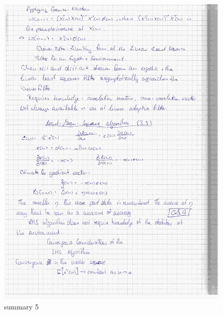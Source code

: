 \documentclass[paper=a4, fontsize=11pt]{scrartcl} %
\numberwithin{equation}{section} %
\numberwithin{figure}{section} %
\numberwithin{table}{section} %
\begin{document}
\begin{figure}[ht]
	\centering
  \includegraphics[width=0.7\textheight]{08.jpg}
	\caption{summary 5}
	\label{fig5}
\end{figure}
\end{document}

